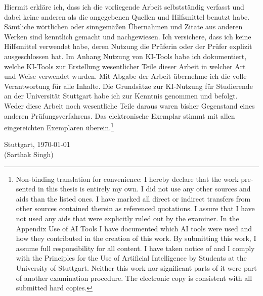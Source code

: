 \documentclass[12pt,leqno,a4paper]{report}
\begin{document}
\noindent Hiermit erkl\"are ich, dass ich die vorliegende Arbeit selbstst\"andig verfasst und dabei keine anderen als die angegebenen Quellen und Hilfsmittel benutzt habe. S\"amtliche w\"ortlichen oder sinngem\"a\ss{}en \"Ubernahmen und Zitate aus anderen Werken sind kenntlich gemacht und nachgewiesen. Ich versichere, dass ich keine Hilfsmittel verwendet habe, deren Nutzung die Pr\"uferin oder der Pr\"ufer explizit ausgeschlossen hat. Im Anhang \glqq Nutzung von KI-Tools\grqq{} habe ich dokumentiert, welche KI-Tools zur Erstellung wesentlicher Teile dieser Arbeit in welcher Art und Weise verwendet wurden. Mit Abgabe der Arbeit \"ubernehme ich die volle Verantwortung f\"ur alle Inhalte. Die Grunds\"atze zur KI-Nutzung f\"ur Studierende an der Universit\"at Stuttgart habe ich zur Kenntnis genommen und befolgt. Weder diese Arbeit noch wesentliche Teile daraus waren bisher Gegenstand eines anderen Pr\"ufungsverfahrens. Das elektronische Exemplar stimmt mit allen eingereichten Exemplaren \"uberein.\footnote{\foreignlanguage{english}{Non-binding translation for convenience: I hereby declare that the work presented in this thesis is entirely my own. I did not use any other sources and aids than the listed ones. I have marked all direct or indirect transfers from other sources contained therein as referenced quotations. I assure that I have not used any aids that were explicitly ruled out by the examiner. In the Appendix \glqq Use of AI Tools\grqq{} I have documented which AI tools were used and how they contributed in the creation of this work. By submitting this work, I assume full responsibility for all content. I have taken notice of and I comply with the Principles for the Use of Artificial Intelligence by Students at the University of Stuttgart. Neither this work nor significant parts of it were part of another examination procedure. The electronic copy is consistent with all submitted hard copies.}}\\[2cm]

\noindent Stuttgart, \today\\[1.5cm] %
\noindent (Sarthak Singh)
\clearpage



\setcounter{page}{1}
\tableofcontents
\clearpage
\listoffigures
\clearpage
\listoftables
\clearpage
\end{document}
